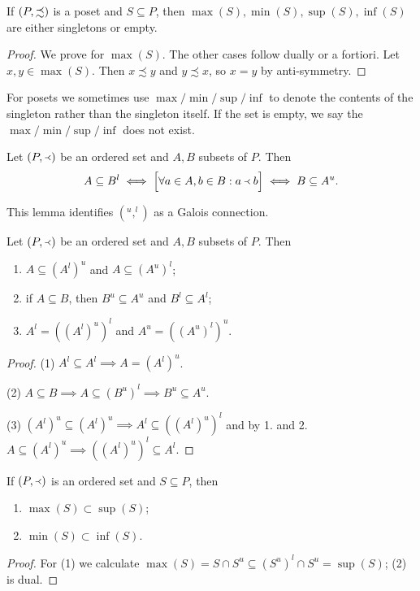 \begin{lemma} \label{lemma:minMaxSingletons}
If $\left( P, \precsim \right)$ is a poset and $S\subseteq P$, then $\max(S), \min(S), \sup(S), \inf(S)$ are either singletons or empty.
\end{lemma}
\begin{proof}
We prove for $\max(S)$. The other cases follow dually or a fortiori. Let $x,y\in \max(S)$. Then $x\precsim y$ and $y\precsim x$, so $x=y$ by anti-symmetry.
\end{proof}
For posets we sometimes use $\max/\min/\sup/\inf$ to denote the contents of the singleton rather than the singleton itself. If the set is empty, we say the $\max/\min/\sup/\inf$ does not exist.


\begin{lemma}
Let $(P,\Yleft)$ be an ordered set and $A,B$ subsets of $P$. Then
\[ A\subseteq B^l \iff \Big[\forall a\in A, b\in B: a\Yleft b \Big] \iff B\subseteq A^u. \]
\end{lemma}
This lemma identifies $(^u,^l)$ as a Galois connection.
\begin{corollary}
Let $(P,\Yleft)$ be an ordered set and $A,B$ subsets of $P$. Then
\begin{enumerate}
\item $A\subseteq (A^l)^u$ and $A\subseteq (A^u)^l$;
\item if $A\subseteq B$, then $B^u\subseteq A^u$ and $B^l \subseteq A^l$;
\item $A^l = ((A^l)^u)^l$ and $A^u = ((A^u)^l)^u$.
\end{enumerate}
\end{corollary}
\begin{proof}
(1) $A^l \subseteq A^l \implies A = (A^l)^u$.

(2) $A\subseteq B \implies A \subseteq (B^u)^l \implies B^u\subseteq A^u$.

(3) $(A^l)^u \subseteq (A^l)^u \implies A^l \subseteq ((A^l)^u)^l$ and by 1. and 2. $A\subseteq (A^l)^u \implies ((A^l)^u)^l \subseteq A^l$.
\end{proof}
\begin{corollary} \label{corollary:maxSupMinInf}
If $\left( P, \Yleft \right)$ is an ordered set and $S\subseteq P$, then
\begin{enumerate}
\item $\max(S)\subset \sup(S)$;
\item $\min(S)\subset \inf(S)$.
\end{enumerate}
\end{corollary}
\begin{proof}
For (1) we calculate $\max(S) = S \cap S^u \subseteq (S^u)^l \cap S^u = \sup(S)$; (2) is dual.
\end{proof}
